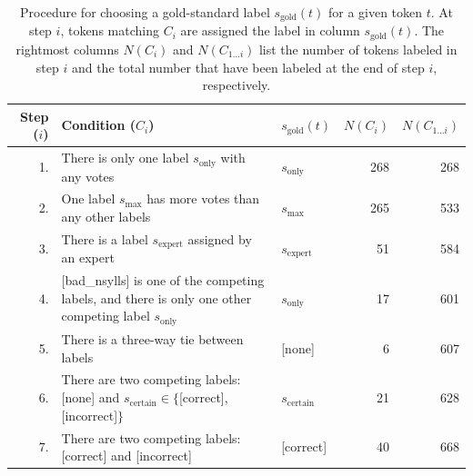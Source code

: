 		

		\begin{table}[htb]
		\caption[Procedure for choosing a gold-standard label for a given token]{Procedure for choosing a gold-standard label $s_{\text{gold}}(t)$ for a given token $t$. At step $i$, tokens matching $C_i$ are assigned the label in column $s_{\text{gold}}(t)$. The rightmost columns $N(C_i)$ and $N(C_{1 \dots i})$ list the number of tokens labeled in step $i$ and the total number that have been labeled at the end of step $i$, respectively.}
			\begin{tabularx}{\textwidth}{rXlrr}
			\toprule
			Step ($i$)
			& Condition ($C_i$) \TODO{reword w/ $S_t$\&$S_{\text{max}}$} & $s_{\text{gold}}(t)$ & $N(C_i)$ & $N(C_{1 \dots i})$ \\
			\midrule
			
			1.& There is only one label $s_{\text{only}}$ with any votes & 
			$s_{\text{only}}$ & 268 & 268 \\
			 
			2.& One label $s_{\text{max}}$ has more votes than any other labels & 
			$s_{\text{max}}$ & 265 & 533 \\
			
			3.& There is a label $s_{\text{expert}}$ assigned by an expert & 
			$s_{\text{expert}}$ & 51 & 584 \\
			
			4.& \mbox{[bad\_nsylls]} is one of the competing labels, 
			and there is only one other competing label $s_{\text{only}}$  \TODO{reword}
			& 
			$s_{\text{only}}$ & 17 & 601 \\
			
			5.& There is a three-way tie between labels
			&
			\mbox{[none]} & 6 & 607\\
			
			6.& There are two competing labels: 
			\mbox{[none]} and 
			$s_{\text{certain}} \in \{$[correct],[incorrect]$\}$ &
			$s_{\text{certain}}$ & 21 & 628\\
			
			7.& There are two competing labels: \mbox{[correct]} and \mbox{[incorrect]} &
			\mbox{[correct]} & 40 & 668\\
	
			\bottomrule
			\end{tabularx}
		\label{tab:agreement:goldrules}
		\end{table}
		
